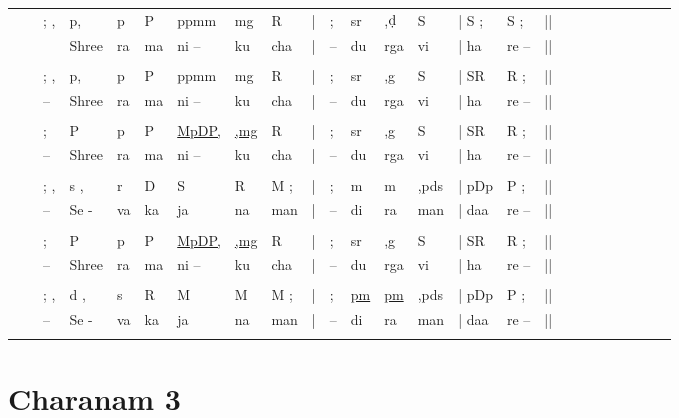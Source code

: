 \documentclass[12pt]{article}
\newcommand*\ud[1]{\mathrm{\underaccent{\dot}{#1}}}
\begin{document}
\begin{tabu}{l l l l l l l l l l l l l l l l l l l l l l l l l }

&&; ,&p,&p&P&ppmm&mg&R&|&;& sr&,$\ud{d}$&S&| S ;&S ;&||\\
\rowfont{\scriptsize}&& &Shree&ra&ma&ni -- &ku&cha&|&--&du&rga& vi&| ha&re --&||\\
\\
&&; ,&p,&p&P&ppmm&mg&R&|&;& sr&,g&S&| SR&R ;&||\\
\rowfont{\scriptsize}&&--&Shree&ra&ma&ni -- &ku&cha&|&--&du&rga& vi&| ha&re --&||\\
\\
&&; &P&p&P&\underline{MpDP,}&\underline{,mg}&R&|&;& sr&,g&S&| SR&R ;&||\\
\rowfont{\scriptsize}&&--&Shree&ra&ma&ni -- &ku&cha&|&--&du&rga& vi&| ha&re --&||\\
\\
&&; ,&s ,&r&D&S&R&M ;&|&;& m&m&,pds&| pDp&P ;&||\\
\rowfont{\scriptsize}&&--&Se -&va&ka&ja&na&man&|&--&di&ra& man&| daa&re --&||\\
\\
&&; &P&p&P&\underline{MpDP,}&\underline{,mg}&R&|&;& sr&,g&S&| SR&R ;&||\\
\rowfont{\scriptsize}&&--&Shree&ra&ma&ni -- &ku&cha&|&--&du&rga& vi&| ha&re --&||\\
\\
&&; ,&d ,&s&R&M&M&M ;&|&;& \underline{pm}&\underline{pm}&,pds&| pDp&P ;&||\\
\rowfont{\scriptsize}&&--&Se -&va&ka&ja&na&man&|&--&di&ra& man&| daa&re --&||\\
\\
\end{tabu}

\section*{Charanam 3}
\end{document}
